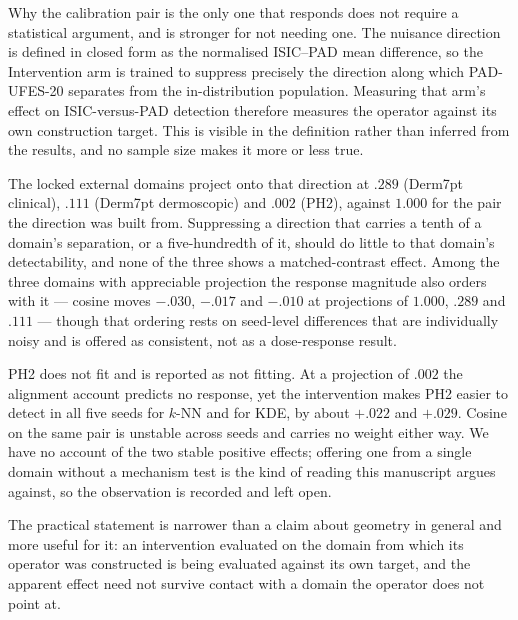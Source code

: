 \documentclass[11pt,a4paper]{article}
\begin{document}
Why the calibration pair is the only one that responds does not require a
statistical argument, and is stronger for not needing one. The nuisance
direction is defined in closed form as the normalised ISIC--PAD mean
difference, so the Intervention arm is trained to suppress precisely the
direction along which PAD-UFES-20 separates from the in-distribution
population. Measuring that arm's effect on ISIC-versus-PAD detection therefore
measures the operator against its own construction target. This is visible in
the definition rather than inferred from the results, and no sample size makes
it more or less true.

The locked external domains project onto that direction at $.289$ (Derm7pt
clinical), $.111$ (Derm7pt dermoscopic) and $.002$ (PH2), against $1.000$ for
the pair the direction was built from. Suppressing a direction that carries a
tenth of a domain's separation, or a five-hundredth of it, should do little to
that domain's detectability, and none of the three shows a matched-contrast
effect. Among the three domains with appreciable projection the response
magnitude also orders with it --- cosine moves $-.030$, $-.017$ and $-.010$ at
projections of $1.000$, $.289$ and $.111$ --- though that ordering rests on
seed-level differences that are individually noisy and is offered as
consistent, not as a dose-response result.

PH2 does not fit and is reported as not fitting. At a projection of $.002$ the
alignment account predicts no response, yet the intervention makes PH2 easier
to detect in all five seeds for $k$-NN and for KDE, by about $+.022$ and
$+.029$. Cosine on the same pair is unstable across seeds and carries no weight
either way. We have no account of the two stable positive effects; offering one
from a single domain without a mechanism test is the kind of reading this
manuscript argues against, so the observation is recorded and left open.

The practical statement is narrower than a claim about geometry in general and
more useful for it: an intervention evaluated on the domain from which its
operator was constructed is being evaluated against its own target, and the
apparent effect need not survive contact with a domain the operator does not
point at.
\end{document}
